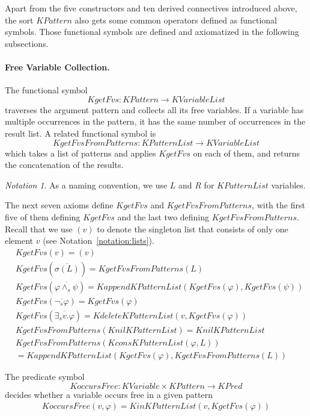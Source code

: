 \documentclass[UTF8,11pt]{article}
\newcounter{thmcounter}
\theoremstyle{plain}
\theoremstyle{definition}
\theoremstyle{remark}
\newtheorem{notation}   [thmcounter]{Notation}
\newcommand{\KPred}{\mathit{KPred}}
\newcommand{\KPatternList}{\mathit{KPatternList}}
\newcommand{\KnilKPatternList}{\mathit{KnilKPatternList}}
\newcommand{\KconsKPatternList}{\mathit{KconsKPatternList}}
\newcommand{\KappendKPatternList}{\mathit{KappendKPatternList}}
\newcommand{\KinKPatternList}{\mathit{KinKPatternList}}
\newcommand{\KdeleteKPatternList}{\mathit{KdeleteKPatternList}}
\newcommand{\KVariableList}{\mathit{KVariableList}}
\newcommand{\KVariable}{\mathit{KVariable}}
\newcommand{\KPattern}{\mathit{KPattern}}
\newcommand{\KgetFvs}{\mathit{KgetFvs}}
\newcommand{\KgetFvsFromPatterns}{\mathit{KgetFvsFromPatterns}}
\newcommand{\KoccursFree}{\mathit{KoccursFree}}
\begin{document}
Apart from the five constructors and ten derived connectives introduced above, the sort $\KPattern$ also gets some common operators defined as functional symbols.
Those functional symbols are defined and axiomatized in the following 
subsections.

\paragraph{Free Variable Collection.}
The functional symbol 
$$\KgetFvs \colon \KPattern \to \KVariableList$$
traverses the argument pattern and collects all its free variables.
If a variable has multiple occurrences in the pattern, it has the same 
number of occurrences in the result list.
A related functional symbol is 
$$ \KgetFvsFromPatterns \colon \KPatternList \to \KVariableList $$
which takes a list of patterns and applies $\KgetFvs$ on each of them, and returns the concatenation of the results.
\begin{notation}
	As a naming convention, we use $L$ and $R$ for $\KPatternList$ variables. 
\end{notation}
The next seven axioms define $\KgetFvs$ and $\KgetFvsFromPatterns$, with the 
first five of them defining $\KgetFvs$ and the last two defining 
$\KgetFvsFromPatterns$.
Recall that we use $(v)$ to denote the singleton list that consists of only one 
element $v$ (see Notation~\ref{notation:lists}).
\begin{align*}
& \KgetFvs(v) = (v)
\\
& \KgetFvs(\overline{\sigma(L)}) = \KgetFvsFromPatterns(L)
\\
& \KgetFvs(\overline{\varphi \wedge_s \psi}) = \KappendKPatternList(\KgetFvs(\varphi), \KgetFvs(\psi))
\\
& \KgetFvs(\overline{\neg_s \varphi}) = \KgetFvs(\varphi)
\\
& \KgetFvs(\overline{\exists_s v . \varphi}) = \KdeleteKPatternList(v, 
\KgetFvs(\varphi))
\\
& \KgetFvsFromPatterns(\KnilKPatternList) = \KnilKPatternList
\\
& \KgetFvsFromPatterns(\KconsKPatternList(\varphi, L))
\\
& = \KappendKPatternList(\KgetFvs(\varphi), \KgetFvsFromPatterns(L))
\end{align*}

The predicate symbol
$$ \KoccursFree \colon \KVariable \times \KPattern \to \KPred $$
decides whether a variable occurs free in a given pattern
\begin{align*}
  \KoccursFree(v, \varphi) = \KinKPatternList(v, \KgetFvs(\varphi))
\end{align*}
\end{document}
